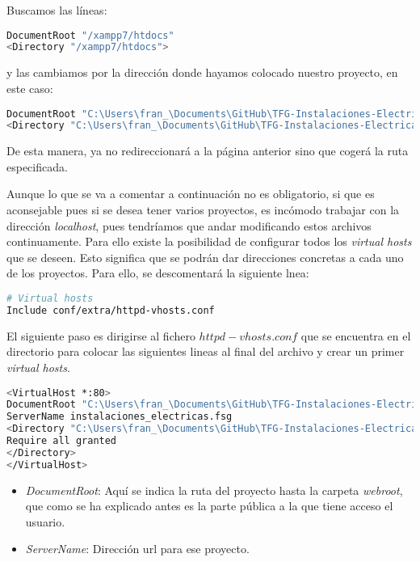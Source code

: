 Buscamos las líneas: 
\begin{lstlisting}[language=bash]
DocumentRoot "/xampp7/htdocs"
<Directory "/xampp7/htdocs">
\end{lstlisting}
y las cambiamos por la dirección donde hayamos colocado nuestro proyecto, en este caso: 
\begin{lstlisting}[language=bash]
DocumentRoot "C:\Users\fran_\Documents\GitHub\TFG-Instalaciones-Electricas\web\instalaciones_electricas"
<Directory "C:\Users\fran_\Documents\GitHub\TFG-Instalaciones-Electricas\web\instalaciones_electricas">
\end{lstlisting}

De esta manera, ya no redireccionará a la página anterior sino que cogerá la ruta especificada.

Aunque lo que se va a comentar a continuación no es obligatorio, si que es aconsejable pues si se desea tener varios proyectos, es incómodo trabajar con la dirección \textit{localhost}, pues tendríamos que andar modificando estos archivos continuamente. Para ello existe la posibilidad de configurar todos los \textit{virtual hosts} que se deseen. Esto significa que se podrán dar direcciones concretas a cada uno de los proyectos. Para ello, se descomentará la siguiente lnea:

\begin{lstlisting}[language=bash]
# Virtual hosts
Include conf/extra/httpd-vhosts.conf
\end{lstlisting}

El siguiente paso es dirigirse al fichero $httpd-vhosts.conf$ que se encuentra en el directorio \textit{} para colocar las siguientes lineas al final del archivo y crear un primer \textit{virtual hosts}.

\begin{lstlisting}[language=bash]
<VirtualHost *:80>
DocumentRoot "C:\Users\fran_\Documents\GitHub\TFG-Instalaciones-Electricas\web\instalaciones_electricas\webroot"
ServerName instalaciones_electricas.fsg
<Directory "C:\Users\fran_\Documents\GitHub\TFG-Instalaciones-Electricas\web\instalaciones_electricas\webroot">
Require all granted
</Directory>
</VirtualHost>
\end{lstlisting}

\begin{itemize}
\item \textit{DocumentRoot}: Aquí se indica la ruta del proyecto hasta la carpeta \textit{webroot}, que como se ha explicado antes es la parte pública a la que tiene acceso el usuario.
\item \textit{ServerName}: Dirección url para ese proyecto.
\end{itemize}

